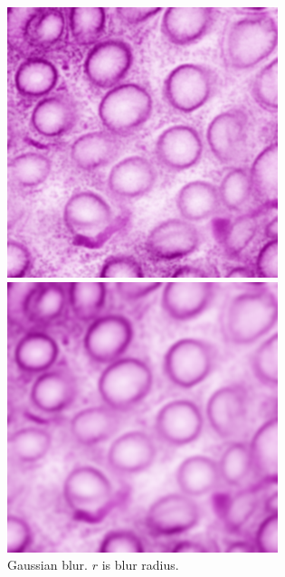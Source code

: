 \begin{figure}[H]
\begin{minipage}{0.24\columnwidth}
	\end{minipage}
	\begin{minipage}{0.24\columnwidth}
		\centering
		\includegraphics[clip, width=\linewidth]{fig/preprocessing/data_aug/color/blur/blur_1_00}
	\end{minipage}
	\begin{minipage}{0.24\columnwidth}
		\centering
		\includegraphics[clip, width=\linewidth]{fig/preprocessing/data_aug/color/blur/blur_2_00}
	\end{minipage}
	
	\caption{Gaussian blur. $r$ is blur radius.}
	\label{fig:ガウシアンブラー}
	
\end{figure}

